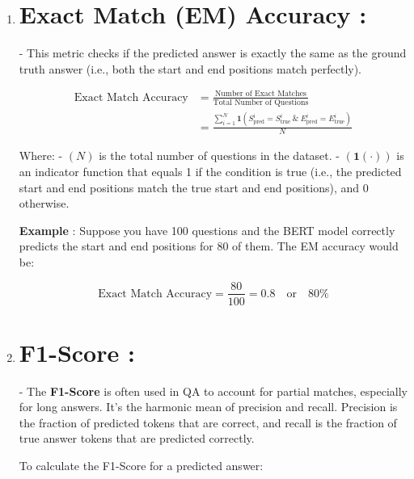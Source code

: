 \documentclass[10pt]{article}
\begin{document}
\begin{enumerate}
   \item 

      \section*{{ \bf Exact Match (EM) Accuracy }:}
      - This metric checks if the predicted answer is exactly the same as the ground truth answer (i.e., both the start and end positions match perfectly).

      \begin{align*}
         \text{Exact Match Accuracy} & = \frac{\text{Number of Exact Matches}}{\text{Total Number of Questions}} \\
         & = \frac{\sum_{i=1}^{N} \mathbf{1}(S_{\text{pred}}^i = S_{\text{true}}^i \ \&\  E_{\text{pred}}^i = E_{\text{true}}^i)}{N}
      \end{align*}

      Where:
      - $(N)$ is the total number of questions in the dataset.
      - $(\mathbf{1}(\cdot))$ is an indicator function that equals 1 if the condition is true (i.e., the predicted start and end positions match the true start and end positions), and 0 otherwise.

      { \bf Example }: 
      Suppose you have 100 questions and the BERT model correctly predicts the start and end positions for 80 of them. The EM accuracy would be:

      $$
      \text{Exact Match Accuracy} = \frac{80}{100} = 0.8 \quad \text{or} \quad 80\%
      $$

   \item
      \section*{{ \bf F1-Score }:}
      - The { \bf F1-Score } is often used in QA to account for partial matches, especially for long answers. It’s the harmonic mean of precision and recall. Precision is the fraction of predicted tokens that are correct, and recall is the fraction of true answer tokens that are predicted correctly.

      To calculate the F1-Score for a predicted answer:


\end{enumerate}
\end{document}
